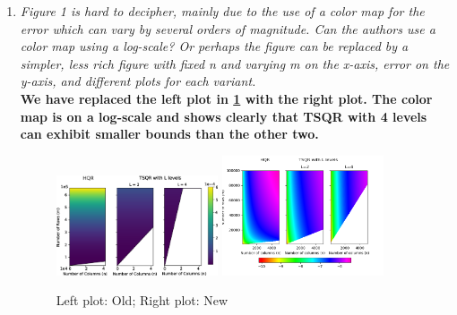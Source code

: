 \documentclass[final,onefignum,onetabnum]{siamart190516}
\begin{document}
\begin{enumerate}
    {\bf We have removed the discussion of speed in our analysis totally, but have kept the the 3 cases for clarity.}
    \item {\it Figure 1 is hard to decipher, mainly due to the use of a color map for the error which can vary by several orders of magnitude. Can the authors use a color map using a log-scale? Or perhaps the figure can be replaced by a simpler, less rich figure with fixed n and varying m on the x-axis, error on the y-axis, and different plots for each variant.}\\
    {\bf We have replaced the left plot in \cref{fig:Fig1} with the right plot. The color map is on a log-scale and shows clearly that TSQR with 4 levels can exhibit smaller bounds than the other two. }
\begin{figure}[h!]
    \centering
    \vspace{-10pt}
    \includegraphics[width=0.45\textwidth]{./figures/paramspace.png}
    \includegraphics[width=0.45\textwidth]{./paramspace2.png}
    \caption{\label{fig:Fig1}Left plot: Old; Right plot: New}
    \vspace{-10pt}
\end{figure} 


\end{enumerate}
\end{document}
